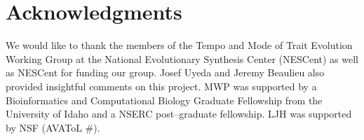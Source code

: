 \documentclass[12pt]{article}
\begin{document}
\section{Acknowledgments}

We would like to thank the members of the Tempo and Mode of Trait Evolution Working Group at the National Evolutionary Synthesis Center (NESCent) as well as NESCent for funding our group. Josef Uyeda and Jeremy Beaulieu also provided insightful comments on this project. MWP was supported by a Bioinformatics and Computational Biology Graduate Fellowship from the University of Idaho and a NSERC post--graduate fellowship. LJH was supported by NSF (AVAToL #).



\newpage


\end{document}
